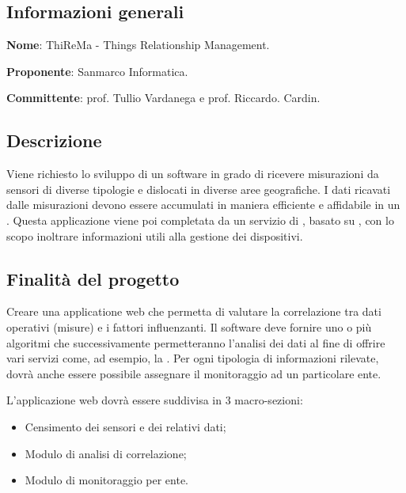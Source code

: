 \documentclass[../studio-di-fattibilita.tex]{subfiles}
\begin{document}
\subsection{Informazioni generali}%
\label{sub:informazioni_generale}
\begin{description}
  \item \textbf{Nome}: ThiReMa - Things Relationship Management.
  \item \textbf{Proponente}: Sanmarco Informatica.
  \item \textbf{Committente}: prof. Tullio Vardanega e prof. Riccardo. Cardin.
\end{description}

\subsection{Descrizione}%
\label{sub:descrizione}
Viene richiesto lo sviluppo di un software in grado di ricevere misurazioni da sensori di diverse tipologie e dislocati in diverse aree geografiche. I dati ricavati dalle misurazioni devono essere accumulati in maniera efficiente e affidabile in un . Questa applicazione viene poi completata da un servizio di , basato su , con lo scopo inoltrare informazioni utili alla gestione dei dispositivi.

\subsection{Finalità del progetto}%
\label{sub:finalita_del_progetto}
Creare una applicatione web che permetta di  valutare la correlazione tra dati operativi (misure) e i fattori influenzanti. Il software deve fornire uno o più algoritmi che successivamente permetteranno l'analisi dei dati al fine di offrire vari servizi come, ad esempio, la .
Per ogni tipologia di informazioni rilevate, dovrà anche essere possibile assegnare il monitoraggio ad un particolare ente.

L'applicazione web dovrà essere suddivisa in 3 macro-sezioni:
\begin{itemize}
    \item Censimento dei sensori e dei relativi dati;
    \item Modulo di analisi di correlazione;
    \item Modulo di monitoraggio per ente.
\end{itemize}
\end{document}
